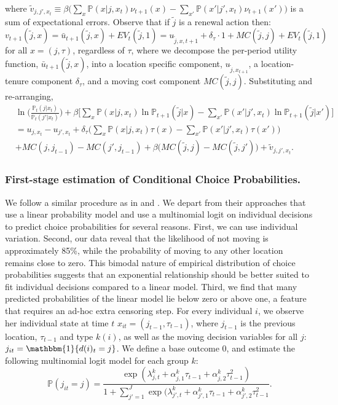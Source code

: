 \documentclass[11pt]{article}
\newcommand{\Prob}{\mathbb{P}}
\begin{document}
where $\tilde{v}_{j,j',x_{t}} \equiv \beta\Big(\sum_{x} \Prob(x|j,x_{t})\nu_{t+1}(x)- \sum_{x'} \Prob(x'|j',x_{t})\nu_{t+1}(x')\Big)$ is a sum of expectational errors. Observe that if $\tilde{j}$ is a renewal action then:
\[v_{t+1}(\tilde{j},x) = \bar{u}_{t+1}(\tilde{j},x)+ EV_t(\tilde{j}, 1) = u_{{\tilde{j},x},t+1} + \delta_{\tau}\cdot 1 + MC(\tilde{j},j) + EV_t(\tilde{j}, 1)
\]
for all $x = (j,\tau)$, regardless of $\tau$, where we decompose the per-period utility function, $\bar{u}_{t+1}(\tilde{j},x)$, into a location specific component, $u_{{\tilde{j}},x_{t+1}}$, a location-tenure component $\delta_{\tau} $, and a moving cost component $MC(\tilde{j},j)$. Substituting and re-arranging,
\begin{align*}
&\ln \Big( \frac{\Prob_t(j|x_{t})}{\Prob_t(j'|x_{t})}\Big)+ \beta\Bigg[\sum_{x} \Prob(x|j,x_{t}) \ln \Prob_{t+1}(\tilde{j}|x) -\sum_{x'} \Prob(x'|j',x_{t}) \ln \Prob_{t+1}(\tilde{j}|x')\Bigg] \\
&=u_{j,x_t}-u_{j',x_t}+\delta_\tau\Big(\sum_{x} \Prob(x|j,x_{t})\tau(x)- \sum_{x'} \Prob(x'|j',x_{t})\tau(x')\Big)\\
&+ MC(j,j_{t-1})- MC(j',j_{t-1})+\beta\Big( MC(\tilde{j},j)- MC(\tilde{j},j')\Big) +\tilde{v}_{j,j',x_{t}}. 
\end{align*} 

\subsubsection{First-stage estimation of Conditional Choice Probabilities.}\label{sec: first stage PPML}
We follow a similar procedure as in \cite{traiberman2019occupations} and \cite{humlum2021robot}. We depart from their approaches that use a linear probability model and use a multinomial logit on individual decisions to predict choice probabilities for several reasons. First, we can use individual variation. Second, our data reveal that the likelihood of not moving is approximately 85\%, while the probability of moving to any other location remains close to zero. This bimodal nature of empirical distribution of choice probabilities suggests that an exponential relationship should be better suited to fit individual decisions compared to a linear model. Third, we find that many predicted probabilities of the linear model lie below zero or above one, a feature that requires an ad-hoc extra censoring step. For every individual $i$, we observe her individual state at time $t$ $x_{it} = (j_{t-1}, \tau_{t-1})$, where $j_{t-1}$ is the previous location, $\tau_{t-1}$  and type $k(i)$, as well as the moving decision variables for all $j$: $j_{it} = \mathbbm{1}\{ d(i)_t = j\}$. We define a base outcome $0$, and estimate the following multinomial logit model for each group $k$:
\[ \Prob(j_{it} = j) = \frac{\exp(\lambda_{j,t}^k + \alpha_{j,1}^k\tau_{t-1} + \alpha_{j,2}^k\tau_{t-1}^2)}{1+ \sum_{j'=1}^J \exp(\lambda_{j',t}^k + \alpha_{j',1}^k\tau_{t-1} + \alpha_{j',2}^k\tau_{t-1}^2}.\]
\end{document}
